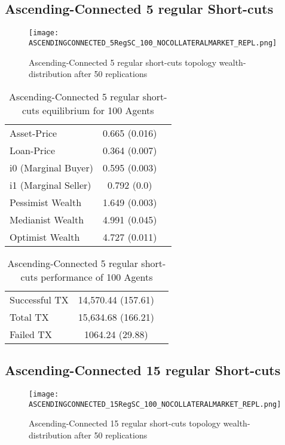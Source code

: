 \documentclass[Bachelorarbeit.tex]{subfiles}
\begin{document}
\subsection{Ascending-Connected 5 regular Short-cuts }
\begin{figure}[!htbp]
	\centering
  \texttt{[image: ASCENDINGCONNECTED\_5RegSC\_100\_NOCOLLATERALMARKET\_REPL.png]}
	\caption{Ascending-Connected 5 regular short-cuts topology wealth-distribution after 50 replications}
	\label{fig1}
\end{figure}

\begin{table}[!htbp]
	\caption{Ascending-Connected 5 regular short-cuts equilibrium for 100 Agents}
	\centering
	\begin{tabular} { l c r }
		\hline
		Asset-Price & 0.665 (0.016) \\
		Loan-Price & 0.364 (0.007) \\
		i0 (Marginal Buyer) & 0.595 (0.003) \\
		i1 (Marginal Seller) & 0.792 (0.0) \\
		Pessimist Wealth & 1.649 (0.003) \\
		Medianist Wealth & 4.991 (0.045) \\
		Optimist Wealth & 4.727 (0.011) \\
		\hline
	\end{tabular}
\end{table} 

\begin{table}[!htbp]
	\caption{Ascending-Connected 5 regular short-cuts performance of 100 Agents}
	\centering
	\begin{tabular} { l c r }
		\hline
		Successful TX & 14,570.44 (157.61) \\
		Total TX & 15,634.68 (166.21) \\
		Failed TX & 1064.24 (29.88) \\
		\hline
	\end{tabular}
\end{table}

\subsection{Ascending-Connected 15 regular Short-cuts }
\begin{figure}[!htbp]
	\centering
  \texttt{[image: ASCENDINGCONNECTED\_15RegSC\_100\_NOCOLLATERALMARKET\_REPL.png]}
	\caption{Ascending-Connected 15 regular short-cuts topology wealth-distribution after 50 replications}
	\label{fig1}
\end{figure}
\end{document}
